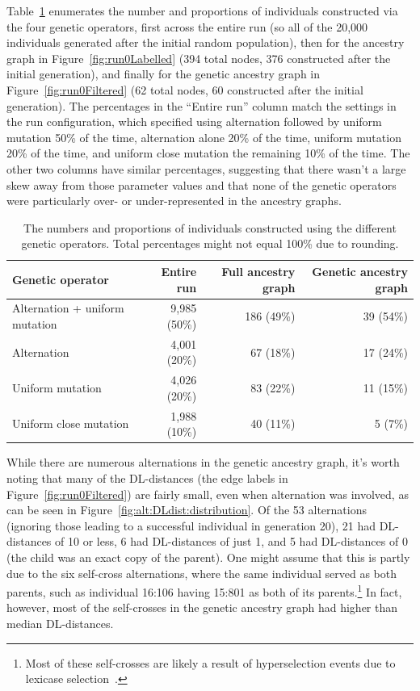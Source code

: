 Table~\ref{tab:operatorCounts} enumerates the number and proportions 
of individuals constructed via the four genetic operators, first across the
entire run (so all of the 20,000 individuals generated after the initial
random population), then for the ancestry graph in 
Figure~\ref{fig:run0Labelled} (394 total nodes, 
376 constructed after the initial generation), and finally for the genetic 
ancestry
graph in Figure~\ref{fig:run0Filtered} (62 total nodes, 60 constructed after 
the initial generation). The percentages in the ``Entire run'' column match
the settings in the run configuration, which specified using alternation 
followed by uniform mutation 50\% of the time, alternation alone 20\% of the 
time, uniform mutation 20\% of the time, and uniform close mutation the 
remaining 10\% of the time. 
The other two columns have similar percentages,
suggesting that there wasn't a large skew away from those parameter values
and that none of the genetic operators were particularly over- or 
under-represented in the ancestry graphs.

\begin{table}[t]
	\begin{tabular}{lrrr}
		\textbf{Genetic operator} & \textbf{Entire run} & \; \textbf{Full ancestry graph} & \; \textbf{Genetic ancestry graph} \\ 
		\hline
		Alternation + uniform mutation & 9,985 (50\%) & 186 (49\%) & 39 (54\%) \\ 
		Alternation & 4,001 (20\%) & 67 (18\%) & 17 (24\%) \\ 
		Uniform mutation & 4,026 (20\%) & 83 (22\%) & 11 (15\%) \\ 
		Uniform close mutation & 1,988 (10\%) & 40 (11\%) & 5 (7\%)
	\end{tabular} 
	\caption{The numbers and proportions of individuals constructed using
		the different genetic operators. Total percentages might not equal 100\% due to rounding.}
	\label{tab:operatorCounts}
\end{table}

While there are numerous alternations in the genetic ancestry graph, it's worth
noting that many of the DL-distances (the edge labels in 
Figure~\ref{fig:run0Filtered}) are fairly small, even when alternation was
involved, as can be seen in Figure~\ref{fig:alt:DLdist:distribution}. Of the
53 alternations (ignoring those leading to a successful individual in 
generation 20), 21 had DL-distances of 10 or less, 6 had DL-distances of just 1,
and 5 had DL-distances of 0 (the child was an exact copy of the parent).
One might assume that this is partly due to the six 
self-cross alternations, where the same individual served as both parents, 
such as individual 16:106 having 15:801 as both of its parents.\footnote{Most of these self-crosses are likely a result of hyperselection events due to lexicase 
selection~\citep{Helmuth:2016:GECCO}.} In fact, however, most of the 
self-crosses in the genetic ancestry graph had higher than median DL-distances.

